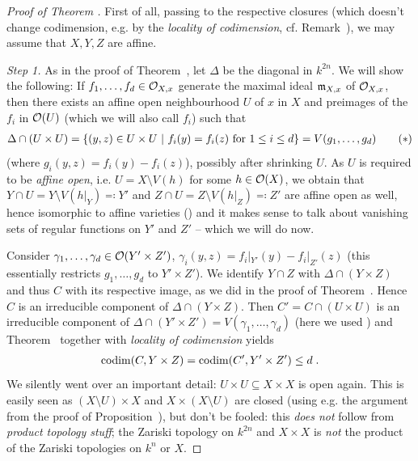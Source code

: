 \documentclass[a4paper,parskip=half,numbers=enddot, DIV=12]{scrreprt}
\begin{document}
\begin{proof}[Proof of Theorem ]
	First of all, passing to the respective closures (which doesn't change codimension, e.g. by the \emph{locality of codimension}, cf. Remark~), we may assume that $X,Y,Z$ are affine.
	
    \emph{Step 1.} As in the proof of Theorem~, let $\Delta$ be the diagonal in $k^{2n}$. We will show the following: If $f_1,\ldots, f_d\in\mathcal{O}_{X,x}$ generate the maximal ideal $\mathfrak{m}_{X,x}$ of $\mathcal{O}_{X,x}$, then there exists an affine open neighbourhood $U$ of $x$ in $X$ and preimages of the $f_i$ in $\mathcal{O}(U)$ (which we will also call $f_i$) such that 
    \begin{align}\lbl{eq:conditionOnUxU}
        \Delta \cap (U\times U) = \left\{(y,z)\in U\times U \st f_i(y) = f_i(z) \text{ for } 1\leq i \leq d\right\}= V(g_1,\ldots,g_d)\tag{$*$}
    \end{align}
    (where $g_i(y,z)=f_i(y)-f_i(z)$), possibly after shrinking $U$. As $U$ is required to be \emph{affine open}, i.e. $U=X\setminus V(h)$ for some $h\in\mathcal{O}(X)$, we obtain that $Y\cap U=Y\setminus V(h|_Y)\eqqcolon Y'$ and $Z\cap U=Z\setminus V(h|_Z)\eqqcolon Z'$ are affine open as well, hence isomorphic to affine varieties (\cite[Proposition~2.2.4]{alg1}) and it makes sense to talk about vanishing sets of regular functions on $Y'$ and $Z'$ -- which we will do now. 
    
    Consider $\gamma_1,\ldots, \gamma_d\in\mathcal{O}(Y'\times Z')$, $\gamma_i(y,z)=f_i|_{Y'}(y)-f_i|_{Z'}(z)$ (this essentially restricts $g_1,\ldots, g_d$ to $Y'\times Z'$). We identify $Y\cap Z$ with $\Delta\cap (Y\times Z)$ and thus $C$ with its respective image, as we did in the proof of Theorem~. Hence $C$ is an irreducible component of $\Delta\cap (Y\times Z)$. Then $C'=C\cap (U\times U)$ is an irreducible component of $\Delta\cap (Y'\times Z')=V(\gamma_1,\ldots,\gamma_d)$ (here we used ) and Theorem~ together with \emph{locality of codimension} yields
    \begin{align*}
    	\operatorname{codim}(C,Y\times Z)=\operatorname{codim}(C',Y'\times Z')\leq d\;.
    \end{align*}
    We silently went over an important detail: $U\times U\subseteq X\times X$ is open again. This is easily seen as $(X\setminus U)\times X$ and $X\times (X\setminus U)$ are closed (using e.g. the argument from the proof of Proposition~), but don't be fooled: this \emph{does not} follow from \emph{product topology stuff}; the Zariski topology on $k^{2n}$ and $X\times X$ is \emph{not} the product of the Zariski topologies on $k^n$ or $X$. 
    

\end{proof}
\end{document}
